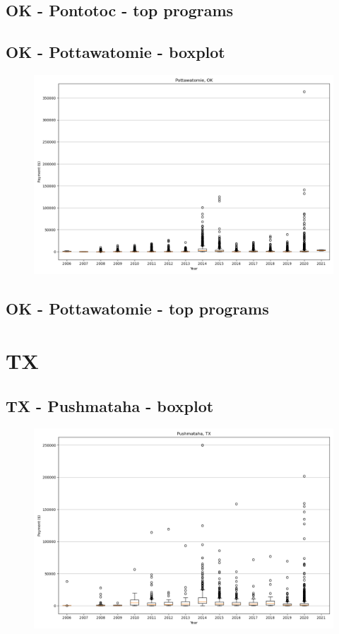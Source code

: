 \subsection*{OK - Pontotoc - top programs}

\newpage
\subsection*{OK - Pottawatomie - boxplot}
\begin{figure}[h]
\centering
\includegraphics[width=7in]{../output/boxplots/counties/Pottawatomie-OK_boxplot.png}
\end{figure}


\subsection*{OK - Pottawatomie - top programs}

\newpage
\section*{TX}
\subsection*{TX - Pushmataha - boxplot}
\begin{figure}[h]
\centering
\includegraphics[width=7in]{../output/boxplots/counties/Pushmataha-TX_boxplot.png}
\end{figure}


